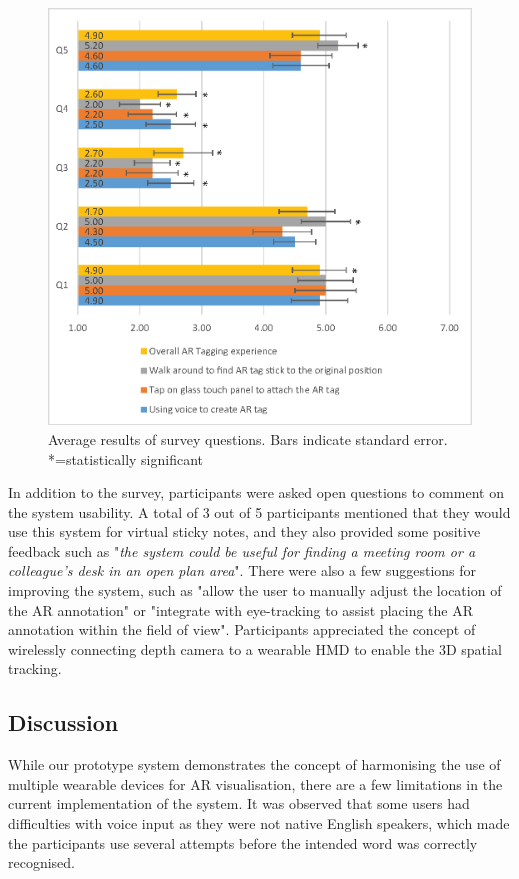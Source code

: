 \begin{figure}
  \centering
  \includegraphics[width=.8\linewidth]{images/62-3d-mgia15/user_study_results2.eps}
  \caption{Average results of survey questions. Bars indicate standard error. *=statistically significant}
    \label{survey_results}
\end{figure}

In addition to the survey, participants were asked open questions to comment on the system usability. A total of 3 out of 5 participants mentioned that they would use this system for virtual sticky notes, and they also provided some positive feedback such as "\textit{the system could be useful for finding a meeting room or a colleague's desk in an open plan area}". There were also a few suggestions for improving the system, such as "allow the user to manually adjust the location of the AR annotation" or "integrate with eye-tracking to assist placing the AR annotation within the field of view". Participants appreciated the concept of wirelessly connecting depth camera to a wearable HMD to enable the 3D spatial tracking.    

\subsection{Discussion}

While our prototype system demonstrates the concept of harmonising the use of multiple wearable devices for AR visualisation, there are a few limitations in the current implementation of the system. It was observed that some users had difficulties with voice input as they were not native English speakers, which made the participants use several attempts before the intended word was correctly recognised.  

